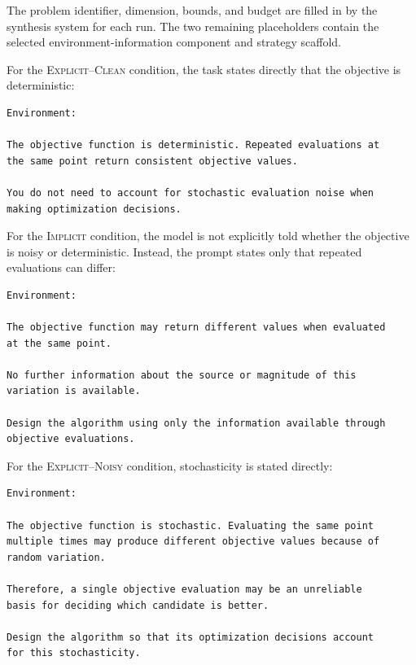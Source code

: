 The problem identifier, dimension, bounds, and budget are filled in by the
synthesis system for each run. The two remaining placeholders contain the
selected environment-information component and strategy scaffold.


For the \textsc{Explicit--Clean} condition, the task states directly that the
objective is deterministic:

\begin{verbatim}
Environment:

The objective function is deterministic. Repeated evaluations at
the same point return consistent objective values.

You do not need to account for stochastic evaluation noise when
making optimization decisions.
\end{verbatim}

For the \textsc{Implicit} condition, the model is not explicitly told whether
the objective is noisy or deterministic. Instead, the prompt states only that
repeated evaluations can differ:

\begin{verbatim}
Environment:

The objective function may return different values when evaluated
at the same point.

No further information about the source or magnitude of this
variation is available.

Design the algorithm using only the information available through
objective evaluations.
\end{verbatim}

For the \textsc{Explicit--Noisy} condition, stochasticity is stated directly:

\begin{verbatim}
Environment:

The objective function is stochastic. Evaluating the same point
multiple times may produce different objective values because of
random variation.

Therefore, a single objective evaluation may be an unreliable
basis for deciding which candidate is better.

Design the algorithm so that its optimization decisions account
for this stochasticity.
\end{verbatim}

